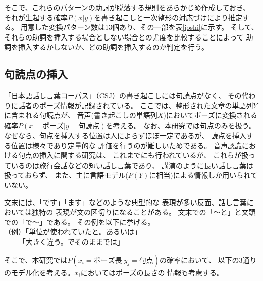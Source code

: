 そこで、これらのパターンの助詞が脱落する規則をあらかじめ作成しておき、
それが生起する確率$P(x|y)$を書き起こしと一次整形の対応づけにより推定する。
用意した変換パターン数は13個あり、その一部を表\ref{joshi}に示す。
そして、それらの助詞を挿入する場合としない場合との尤度を比較することによって
助詞を挿入するかしないか、どの助詞を挿入するのか判定を行う。

\subsection{句読点の挿入}

「日本語話し言葉コーパス」（CSJ）の書き起こしには句読点がなく、
その代わりに話者のポーズ情報が記録されている。
ここでは、整形された文章の単語列$Y$に含まれる句読点が、
音声(書き起こしの単語列$X$)においてポーズに変換される確率$P(x=ポーズ|y=句読点)$を考える。
なお、本研究では句点のみを扱う。
なぜなら、句点を挿入する位置は人によらずほぼ一定であるが、
読点を挿入する位置は様々であり定量的な
評価を行うのが難しいためである。
音声認識における句点の挿入に関する研究は、
これまでにも行われているが\cite{nakashima_2001,takesawa_1999,Euro_1999}、
これらが扱っているのは旅行会話などの短い話し言葉であり、
講演のように長い話し言葉は扱っておらず、
また、主に言語モデル($P(Y)$に相当)による情報しか用いられていない。

文末には、「です」「ます」などのような典型的な
表現が多い反面、話し言葉においては独特の
表現が文の区切りになることがある。
文末での「〜と」と文頭での「で〜」である。
その例を以下に挙げる。\\
（例）「単位が使われていたと。あるいは」\\
\verb+    +「大きく違う。でそのままでは」

そこで、本研究では$P(x_i=ポーズ長|y_j=句点)$の確率において、
以下の3通りのモデル化を考える。$x_i$においてはポーズの長さの
情報も考慮する。

